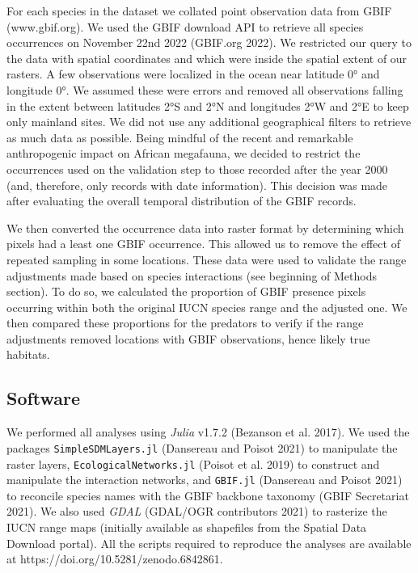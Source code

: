 \documentclass[10pt,oneside]{article}
\begin{document}
For each species in the dataset we collated point observation data from
GBIF (www.gbif.org). We used the GBIF download API to retrieve all
species occurrences on November 22nd 2022 (GBIF.org 2022). We restricted
our query to the data with spatial coordinates and which were inside the
spatial extent of our rasters. A few observations were localized in the
ocean near latitude 0° and longitude 0°. We assumed these were errors
and removed all observations falling in the extent between latitudes 2°S
and 2°N and longitudes 2°W and 2°E to keep only mainland sites. We did
not use any additional geographical filters to retrieve as much data as
possible. Being mindful of the recent and remarkable anthropogenic
impact on African megafauna, we decided to restrict the occurrences used
on the validation step to those recorded after the year 2000 (and,
therefore, only records with date information). This decision was made
after evaluating the overall temporal distribution of the GBIF records.

We then converted the occurrence data into raster format by determining
which pixels had a least one GBIF occurrence. This allowed us to remove
the effect of repeated sampling in some locations. These data were used
to validate the range adjustments made based on species interactions
(see beginning of Methods section). To do so, we calculated the
proportion of GBIF presence pixels occurring within both the original
IUCN species range and the adjusted one. We then compared these
proportions for the predators to verify if the range adjustments removed
locations with GBIF observations, hence likely true habitats.

\hypertarget{software}{%
\subsection{Software}\label{software}}

We performed all analyses using \emph{Julia} v1.7.2 (Bezanson et al.
2017). We used the packages \texttt{SimpleSDMLayers.jl} (Dansereau and
Poisot 2021) to manipulate the raster layers,
\texttt{EcologicalNetworks.jl} (Poisot et al. 2019) to construct and
manipulate the interaction networks, and \texttt{GBIF.jl} (Dansereau and
Poisot 2021) to reconcile species names with the GBIF backbone taxonomy
(GBIF Secretariat 2021). We also used \emph{GDAL} (GDAL/OGR contributors
2021) to rasterize the IUCN range maps (initially available as
shapefiles from the Spatial Data Download portal). All the scripts
required to reproduce the analyses are available at
https://doi.org/10.5281/zenodo.6842861.
\end{document}
